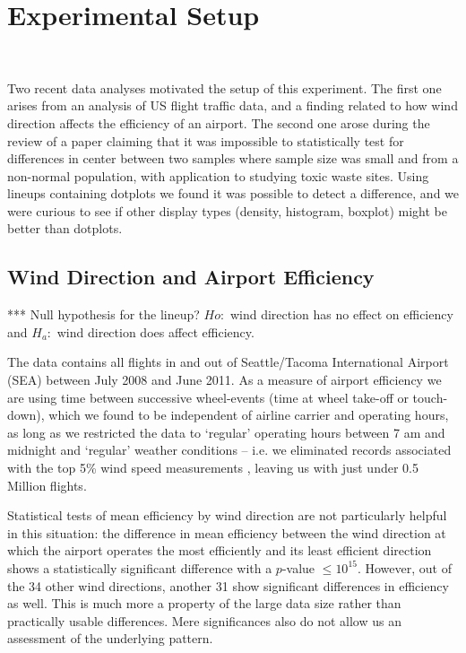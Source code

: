 \section{Experimental Setup}~\label{setup}

Two recent data analyses motivated the setup of this experiment. The first one arises from an analysis of US flight traffic data, and a finding related to how wind direction affects the efficiency of an airport.  The second one arose during the review of a paper claiming that it was impossible to statistically test for differences in center between two samples where sample size was small and from a non-normal population, with application to studying toxic waste sites. Using lineups containing dotplots we found it was possible to detect a difference, and we were curious to see if other display types (density, histogram, boxplot) might be better than dotplots.


\subsection{Wind Direction and Airport Efficiency}

*** Null hypothesis for the lineup?
$Ho: $ wind direction has no effect on efficiency and $H_a:$ wind direction does affect efficiency.

The data contains all flights \cite{rita} in and out of Seattle/Tacoma International Airport (SEA) between July 2008 and June 2011. As a measure of airport efficiency we are using time between successive wheel-events (time at wheel take-off or touch-down), which we found to be independent of airline carrier and operating hours, as long as we restricted the data to `regular' operating hours between 7 am and midnight and `regular' weather conditions -- i.e. we eliminated records associated with the top 5\% wind speed measurements \cite{noaa-weather}, leaving us with just under 0.5 Million flights.

Statistical tests of mean efficiency by wind direction are not particularly helpful in this situation: the difference in mean efficiency between the  wind direction at which the airport operates the most efficiently and its least efficient direction shows a statistically significant difference with a $p$-value $\le 10^{15}$. %
However, out of the 34 other wind directions,  another 31 show significant differences in efficiency as well. This is much more a property of the large data size rather than practically usable differences. Mere significances also do not allow us an assessment of the underlying pattern.


